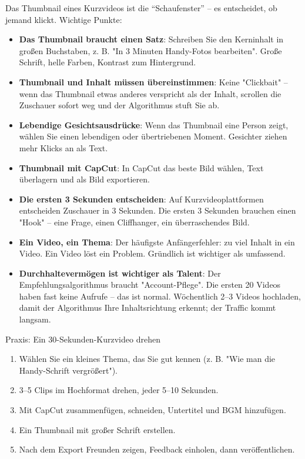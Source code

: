 
Das Thumbnail eines Kurzvideos ist die “Schaufenster” – es entscheidet, ob jemand klickt. Wichtige Punkte:

\begin{itemize}
  \item \textbf{Das Thumbnail braucht einen Satz}: Schreiben Sie den Kerninhalt in großen Buchstaben, z. B. "In 3 Minuten Handy-Fotos bearbeiten". Große Schrift, helle Farben, Kontrast zum Hintergrund.
  \item \textbf{Thumbnail und Inhalt müssen übereinstimmen}: Keine "Clickbait" – wenn das Thumbnail etwas anderes verspricht als der Inhalt, scrollen die Zuschauer sofort weg und der Algorithmus stuft Sie ab.
  \item \textbf{Lebendige Gesichtsausdrücke}: Wenn das Thumbnail eine Person zeigt, wählen Sie einen lebendigen oder übertriebenen Moment. Gesichter ziehen mehr Klicks an als Text.
  \item \textbf{Thumbnail mit CapCut}: In CapCut das beste Bild wählen, Text überlagern und als Bild exportieren.
\end{itemize}


\begin{itemize}
  \item \textbf{Die ersten 3 Sekunden entscheiden}: Auf Kurzvideoplattformen entscheiden Zuschauer in 3 Sekunden. Die ersten 3 Sekunden brauchen einen "Hook" – eine Frage, einen Cliffhanger, ein überraschendes Bild.
  \item \textbf{Ein Video, ein Thema}: Der häufigste Anfängerfehler: zu viel Inhalt in ein Video. Ein Video löst ein Problem. Gründlich ist wichtiger als umfassend.
  \item \textbf{Durchhaltevermögen ist wichtiger als Talent}: Der Empfehlungsalgorithmus braucht "Account-Pflege". Die ersten 20 Videos haben fast keine Aufrufe – das ist normal. Wöchentlich 2–3 Videos hochladen, damit der Algorithmus Ihre Inhaltsrichtung erkennt; der Traffic kommt langsam.
\end{itemize}

\begin{tcbpractice}{Praxis: Ein 30-Sekunden-Kurzvideo drehen}
\begin{enumerate}
  \item Wählen Sie ein kleines Thema, das Sie gut kennen (z. B. "Wie man die Handy-Schrift vergrößert").
  \item 3–5 Clips im Hochformat drehen, jeder 5–10 Sekunden.
  \item Mit CapCut zusammenfügen, schneiden, Untertitel und BGM hinzufügen.
  \item Ein Thumbnail mit großer Schrift erstellen.
  \item Nach dem Export Freunden zeigen, Feedback einholen, dann veröffentlichen.
\end{enumerate}

\end{tcbpractice}

